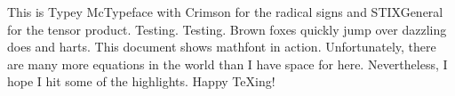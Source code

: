 \documentclass[12pt]{article}
\begin{document}
\let\footnote\@gobble
\def\showabstract{0}
\let\textsf\relax
\let\ttfamily\relax
\def\documentname{Example---Typey McTypeface}



This is Typey McTypeface with Crimson for the radical signs and STIXGeneral for the tensor product. Testing. Testing. Brown foxes quickly jump over dazzling does and harts. This document shows mathfont in action. Unfortunately, there are many more equations in the world than I have space for here. Nevertheless, I hope I hit some of the highlights. Happy \TeX ing!

\let\bullet\cdot

\end{document}
